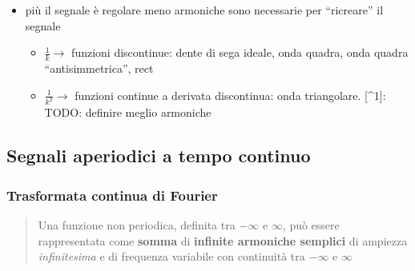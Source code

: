 \documentclass[
]{article}
\providecommand{\tightlist}{%
  \setlength{\itemsep}{0pt}\setlength{\parskip}{0pt}}
\begin{document}
\begin{enumerate}
\begin{itemize}
\begin{itemize}
      \begin{itemize}
      \tightlist
      \item
        più il segnale è regolare meno armoniche sono necessarie per
        ``ricreare'' il segnale

        \begin{itemize}
        \tightlist
        \item
          \(\frac{1}{k} \to\) funzioni discontinue: dente di sega
          ideale, onda quadra, onda quadra ``antisimmetrica'', rect
        \item
          \(\frac{1}{k^2} \to\) funzioni continue a derivata
          discontinua: onda triangolare. {[}\^{}1{]}: TODO: definire
          meglio armoniche
        \end{itemize}
      \end{itemize}
    \end{itemize}
  \end{itemize}
\end{enumerate}

\subsection{Segnali aperiodici a tempo
continuo}\label{segnali-aperiodici-a-tempo-continuo}

\subsubsection{Trasformata continua di
Fourier}\label{trasformata-continua-di-fourier}

\begin{quote}
Una funzione non periodica, definita tra \(-\infty\) e \(\infty\), può
essere rappresentata come \textbf{somma} di \textbf{infinite armoniche
semplici} di ampiezza \emph{infinitesima} e di frequenza variabile con
continuità tra \(-\infty\) e \(\infty\)
\end{quote}
\end{document}
